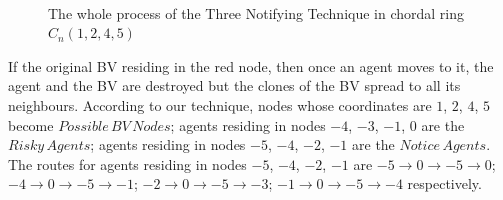 \documentclass[conference]{IEEEtran}
\begin{document}
\begin{figure}
  \centering 
  \hspace{1in} 
   \
  \hspace{1in} 
  \hspace{1in} 
  \caption{The whole process of the Three Notifying Technique in chordal ring $C_n(1, 2, 4, 5)$} 
  \label{fig:subfig} %
\end{figure}


If the original BV residing in the red node, then once an agent moves to it, the agent and the BV are destroyed but the clones of the BV spread to all its neighbours. According to our technique, nodes whose coordinates are $1$, $2$, $4$, $5$ become $Possible\,BV\,Nodes$; agents residing in nodes $-4$, $-3$, $-1$, $0$ are the $Risky\, Agents$; agents residing in nodes $-5$, $-4$, $-2$, $-1$ are the $Notice\,Agents$. The routes for agents residing in nodes $-5$, $-4$, $-2$, $-1$ are $-5{\rightarrow}0{\rightarrow}-5{\rightarrow}0$; $-4{\rightarrow}0{\rightarrow}-5{\rightarrow}-1$; $-2{\rightarrow}0{\rightarrow}-5{\rightarrow}-3$; $-1{\rightarrow}0{\rightarrow}-5{\rightarrow}-4$ respectively.
\end{document}
